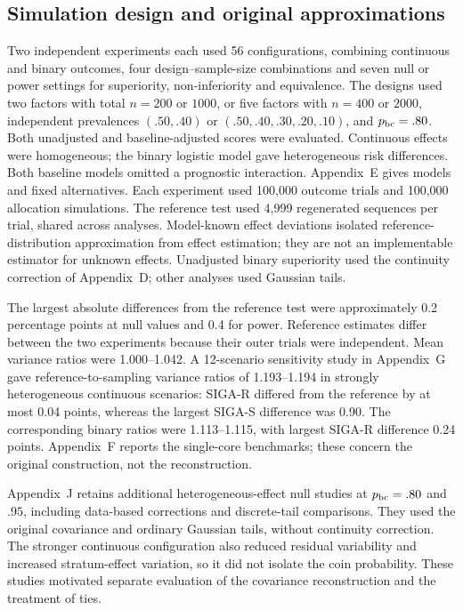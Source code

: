 \documentclass[12pt,a4paper]{article}
\theoremstyle{definition}
\begin{document}
\subsection{Simulation design and original approximations}\label{sec:simulation}\label{sec:simulation-results}
Two independent experiments each used 56 configurations, combining continuous and binary outcomes, four design--sample-size combinations and seven null or power settings for superiority, non-inferiority and equivalence. The designs used two factors with total $n=200$ or $1000$, or five factors with $n=400$ or $2000$, independent prevalences $(.50,.40)$ or $(.50,.40,.30,.20,.10)$, and $p_{\rm bc}=.80$. Both unadjusted and baseline-adjusted scores were evaluated. Continuous effects were homogeneous; the binary logistic model gave heterogeneous risk differences. Both baseline models omitted a prognostic interaction. Appendix~E gives models and fixed alternatives. Each experiment used 100,000 outcome trials and 100,000 allocation simulations. The reference test used 4,999 regenerated sequences per trial, shared across analyses. Model-known effect deviations isolated reference-distribution approximation from effect estimation; they are not an implementable estimator for unknown effects. Unadjusted binary superiority used the continuity correction of Appendix~D; other analyses used Gaussian tails.

The largest absolute differences from the reference test were approximately 0.2 percentage points at null values and 0.4 for power. Reference estimates differ between the two experiments because their outer trials were independent. Mean variance ratios were 1.000--1.042. A 12-scenario sensitivity study in Appendix~G gave reference-to-sampling variance ratios of 1.193--1.194 in strongly heterogeneous continuous scenarios: SIGA-R differed from the reference by at most 0.04 points, whereas the largest SIGA-S difference was 0.90. The corresponding binary ratios were 1.113--1.115, with largest SIGA-R difference 0.24 points. Appendix~F reports the single-core benchmarks; these concern the original construction, not the reconstruction.

Appendix~J retains additional heterogeneous-effect null studies at $p_{\rm bc}=.80$ and $.95$, including data-based corrections and discrete-tail comparisons. They used the original covariance and ordinary Gaussian tails, without continuity correction. The stronger continuous configuration also reduced residual variability and increased stratum-effect variation, so it did not isolate the coin probability. These studies motivated separate evaluation of the covariance reconstruction and the treatment of ties.
\end{document}
